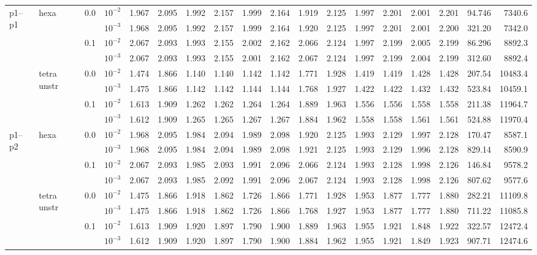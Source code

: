 \begin{longtable}{llclrrrrrrrrrrrrrr}
\multirow{8}{*}{p1--p1} & \multirow{4}{*}{hexa} & \multirow{2}{*}{0.0} & $10^{-2}$ & 1.967 & 2.095 & 1.992 & 2.157 & 1.999 & 2.164 & 1.919 & 2.125 & 1.997 & 2.201 & 2.001 & 2.201 & 94.746 & 7340.6 \\
& & & $10^{-3}$ & 1.968 & 2.095 & 1.992 & 2.157 & 1.999 & 2.164 & 1.920 & 2.125 & 1.997 & 2.201 & 2.001 & 2.200 & 321.20 & 7342.0 \\\cline{3-18}
& & \multirow{2}{*}{0.1} & $10^{-2}$ & 2.067 & 2.093 & 1.993 & 2.155 & 2.002 & 2.162 & 2.066 & 2.124 & 1.997 & 2.199 & 2.005 & 2.199 & 86.296 & 8892.3 \\
& & & $10^{-3}$ & 2.067 & 2.093 & 1.993 & 2.155 & 2.001 & 2.162 & 2.067 & 2.124 & 1.997 & 2.199 & 2.004 & 2.199 & 312.60 & 8892.4 \\\cline{2-18}
& \multirow{4}{*}{tetra unstr} & \multirow{2}{*}{0.0} & $10^{-2}$ & 1.474 & 1.866 & 1.140 & 1.140 & 1.142 & 1.142 & 1.771 & 1.928 & 1.419 & 1.419 & 1.428 & 1.428 & 207.54 & 10483.4 \\
& & & $10^{-3}$ & 1.475 & 1.866 & 1.142 & 1.142 & 1.144 & 1.144 & 1.768 & 1.927 & 1.422 & 1.422 & 1.432 & 1.432 & 523.84 & 10459.1 \\\cline{3-18}
& & \multirow{2}{*}{0.1} & $10^{-2}$ & 1.613 & 1.909 & 1.262 & 1.262 & 1.264 & 1.264 & 1.889 & 1.963 & 1.556 & 1.556 & 1.558 & 1.558 & 211.38 & 11964.7 \\
& & & $10^{-3}$ & 1.612 & 1.909 & 1.265 & 1.265 & 1.267 & 1.267 & 1.884 & 1.962 & 1.558 & 1.558 & 1.561 & 1.561 & 524.88 & 11970.4 \\\hline

\multirow{8}{*}{p1--p2} & \multirow{4}{*}{hexa} & \multirow{2}{*}{0.0} & $10^{-2}$ & 1.968 & 2.095 & 1.984 & 2.094 & 1.989 & 2.098 & 1.920 & 2.125 & 1.993 & 2.129 & 1.997 & 2.128 & 170.47 & 8587.1 \\
& & & $10^{-3}$ & 1.968 & 2.095 & 1.984 & 2.094 & 1.989 & 2.098 & 1.921 & 2.125 & 1.993 & 2.129 & 1.996 & 2.128 & 829.14 & 8590.9 \\\cline{3-18}
& & \multirow{2}{*}{0.1} & $10^{-2}$ & 2.067 & 2.093 & 1.985 & 2.093 & 1.991 & 2.096 & 2.066 & 2.124 & 1.993 & 2.128 & 1.998 & 2.126 & 146.84 & 9578.2 \\
& & & $10^{-3}$ & 2.067 & 2.093 & 1.985 & 2.092 & 1.991 & 2.096 & 2.067 & 2.124 & 1.993 & 2.128 & 1.998 & 2.126 & 807.62 & 9577.6 \\\cline{2-18}
& \multirow{4}{*}{tetra unstr} & \multirow{2}{*}{0.0} & $10^{-2}$ & 1.475 & 1.866 & 1.918 & 1.862 & 1.726 & 1.866 & 1.771 & 1.928 & 1.953 & 1.877 & 1.777 & 1.880 & 282.21 & 11109.8 \\
& & & $10^{-3}$ & 1.475 & 1.866 & 1.918 & 1.862 & 1.726 & 1.866 & 1.768 & 1.927 & 1.953 & 1.877 & 1.777 & 1.880 & 711.22 & 11085.8 \\\cline{3-18}
& & \multirow{2}{*}{0.1} & $10^{-2}$ & 1.613 & 1.909 & 1.920 & 1.897 & 1.790 & 1.900 & 1.889 & 1.963 & 1.955 & 1.921 & 1.848 & 1.922 & 322.57 & 12472.4 \\
& & & $10^{-3}$ & 1.612 & 1.909 & 1.920 & 1.897 & 1.790 & 1.900 & 1.884 & 1.962 & 1.955 & 1.921 & 1.849 & 1.923 & 907.71 & 12474.6 \\\hline


\end{longtable}
